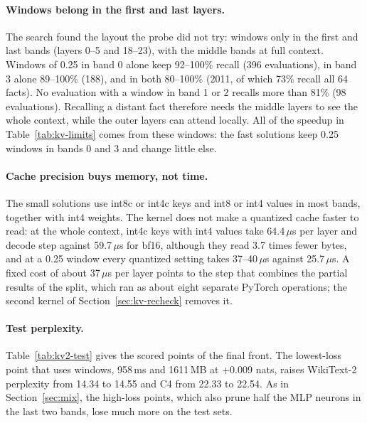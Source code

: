 \documentclass[11pt]{article}
\newcommand{\us}{\,$\mu$s}
\begin{document}
\paragraph{Windows belong in the first and last layers.} The search found the layout the probe did not try:
windows only in the first and last bands (layers 0--5 and 18--23), with the middle bands at full context.
Windows of 0.25 in band 0 alone keep 92--100\% recall (396 evaluations), in band 3 alone 89--100\%
(188), and in both 80--100\% (2011, of which 73\% recall all 64 facts). No evaluation with a window in
band 1 or 2 recalls more than 81\% (98 evaluations). Recalling a distant fact therefore needs the middle
layers to see the whole context, while the outer layers can attend locally. All of the speedup in
Table~\ref{tab:kv-limits} comes from these windows: the fast solutions keep 0.25 windows in bands 0 and 3
and change little else.

\paragraph{Cache precision buys memory, not time.} The small solutions use int8c or int4c keys and int8 or
int4 values in most bands, together with int4 weights. The kernel does not make a quantized cache faster
to read: at the whole context, int4c keys with int4 values take 64.4\us{} per layer and decode step against
59.7\us{} for bf16, although they read 3.7 times fewer bytes, and at a 0.25 window every quantized setting
takes 37--40\us{} against 25.7\us. A fixed cost of about 37\us{} per layer points to the step that combines
the partial results of the split, which ran as about eight separate PyTorch operations; the second kernel of
Section~\ref{sec:kv-recheck} removes it.

\paragraph{Test perplexity.} Table~\ref{tab:kv2-test} gives the scored points of the final front. The
lowest-loss point that uses windows, 958\,ms and 1611\,MB at +0.009 nats, raises WikiText-2 perplexity from
14.34 to 14.55 and C4 from 22.33 to 22.54. As in Section~\ref{sec:mix}, the high-loss points, which also
prune half the MLP neurons in the last two bands, lose much more on the test sets.
\end{document}
